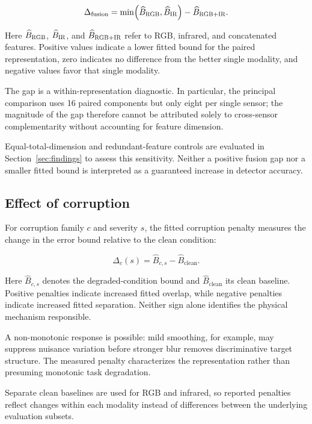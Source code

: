 \documentclass[10pt]{article}
\newcommand{\rgb}{\textsc{RGB}}
\newcommand{\ir}{\textsc{IR}}
\newcommand{\Bhat}{\widehat B}
\newcommand{\bfg}{\Delta_{\mathrm{fusion}}}
\begin{document}
\begin{equation}
\bfg
=
\min\!\left(
\Bhat_{\rgb},
\Bhat_{\ir}
\right)
-
\Bhat_{\rgb+\ir}.
\label{eq:bfg}
\end{equation}

Here $\Bhat_{\rgb}$, $\Bhat_{\ir}$, and $\Bhat_{\rgb+\ir}$ refer to RGB, infrared, and concatenated features. Positive values indicate a lower fitted bound for the paired representation, zero indicates no difference from the better single modality, and negative values favor that single modality.

The gap is a within-representation diagnostic. In particular, the principal comparison uses 16 paired components but only eight per single sensor; the magnitude of the gap therefore cannot be attributed solely to cross-sensor complementarity without accounting for feature dimension.

Equal-total-dimension and redundant-feature controls are evaluated in Section~\ref{sec:findings} to assess this sensitivity. Neither a positive fusion gap nor a smaller fitted bound is interpreted as a guaranteed increase in detector accuracy.

\subsection{Effect of corruption}

For corruption family $c$ and severity $s$, the fitted corruption penalty measures the change in the error bound relative to the clean condition:

\begin{equation}
\Delta_c(s)
=
\Bhat_{c,s}
-
\Bhat_{\mathrm{clean}}.
\label{eq:corruptpenalty}
\end{equation}

Here $\Bhat_{c,s}$ denotes the degraded-condition bound and $\Bhat_{\mathrm{clean}}$ its clean baseline. Positive penalties indicate increased fitted overlap, while negative penalties indicate increased fitted separation. Neither sign alone identifies the physical mechanism responsible.

A non-monotonic response is possible: mild smoothing, for example, may suppress nuisance variation before stronger blur removes discriminative target structure. The measured penalty characterizes the representation rather than presuming monotonic task degradation.

Separate clean baselines are used for RGB and infrared, so reported penalties reflect changes within each modality instead of differences between the underlying evaluation subsets.
\end{document}
